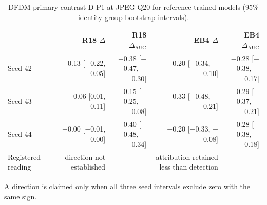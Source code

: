 \begin{table}[t]
\centering
\footnotesize
\caption{DFDM primary contrast D-P1 at JPEG Q20 for reference-trained models (95\% identity-group bootstrap intervals).}
\label{tab:dfdm-primary}
\setlength{\tabcolsep}{3.5pt}
\begin{tabular}{lrrrr}
\toprule
 & R18 $\Delta$ & R18 $\Delta_\mathrm{AUC}$ & EB4 $\Delta$ & EB4 $\Delta_\mathrm{AUC}$ \\
\midrule
Seed 42 & $-$0.13 [$-$0.22, $-$0.05] & $-$0.38 [$-$0.47, $-$0.30] & $-$0.20 [$-$0.34, $-$0.10] & $-$0.28 [$-$0.38, $-$0.17] \\
Seed 43 & 0.06 [0.01, 0.11] & $-$0.15 [$-$0.25, $-$0.08] & $-$0.33 [$-$0.48, $-$0.21] & $-$0.29 [$-$0.37, $-$0.21] \\
Seed 44 & $-$0.00 [$-$0.01, 0.00] & $-$0.40 [$-$0.48, $-$0.34] & $-$0.20 [$-$0.33, $-$0.08] & $-$0.28 [$-$0.38, $-$0.18] \\
Registered reading & direction not established &  & attribution retained less than detection &  \\
\bottomrule
\end{tabular}
\par\smallskip\parbox{\linewidth}{\scriptsize A direction is claimed only when all three seed intervals exclude zero with the same sign.}
\end{table}
